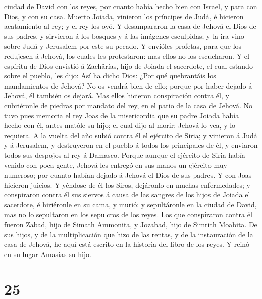 ciudad de David con los reyes, por cuanto había hecho bien con Israel, y
para con Dios, y con su casa.  Muerto Joiada, vinieron
los príncipes de Judá, é hicieron acatamiento al rey; y el rey los oyó.
 Y desampararon la casa de Jehová el Dios de sus padres,
y sirvieron á los bosques y á las imágenes esculpidas; y la ira vino
sobre Judá y Jerusalem por este su pecado.  Y envióles
profetas, para que los redujesen á Jehová, los cuales les protestaron:
mas ellos no los escucharon.  Y el espíritu de Dios
envistió á Zachârías, hijo de Joiada el sacerdote, el cual estando sobre
el pueblo, les dijo: Así ha dicho Dios: ¿Por qué quebrantáis los
mandamientos de Jehová? No os vendrá bien de ello; porque por haber
dejado á Jehová, él también os dejará.  Mas ellos
hicieron conspiración contra él, y cubriéronle de piedras por mandato
del rey, en el patio de la casa de Jehová.  No tuvo pues
memoria el rey Joas de la misericordia que su padre Joiada había hecho
con él, antes matóle su hijo; el cual dijo al morir: Jehová lo vea, y lo
requiera.  A la vuelta del año subió contra él el
ejército de Siria; y vinieron á Judá y á Jerusalem, y destruyeron en el
pueblo á todos los principales de él, y enviaron todos sus despojos al
rey á Damasco.  Porque aunque el ejército de Siria había
venido con poca gente, Jehová les entregó en sus manos un ejército muy
numeroso; por cuanto habían dejado á Jehová el Dios de sus padres. Y con
Joas hicieron juicios.  Y yéndose de él los Siros,
dejáronlo en muchas enfermedades; y conspiraron contra él sus siervos á
causa de las sangres de los hijos de Joiada el sacerdote, é hiriéronle
en su cama, y murió: y sepultáronle en la ciudad de David, mas no lo
sepultaron en los sepulcros de los reyes.  Los que
conspiraron contra él fueron Zabad, hijo de Simath Ammonita, y Jozabad,
hijo de Simrith Moabita.  De sus hijos, y de la
multiplicación que hizo de las rentas, y de la instauración de la casa
de Jehová, he aquí está escrito en la historia del libro de los reyes. Y
reinó en su lugar Amasías su hijo.

\hypertarget{section-24}{%
\section{25}\label{section-24}}

